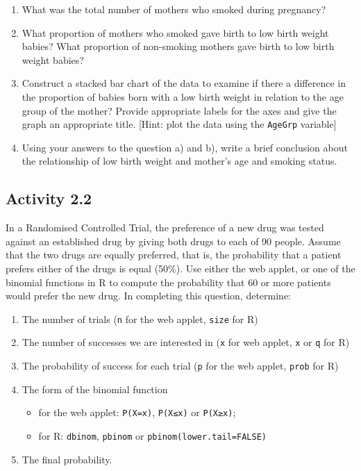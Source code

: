 \documentclass[
  a4paper,
]{memoir}
\providecommand{\tightlist}{%
  \setlength{\itemsep}{0pt}\setlength{\parskip}{0pt}}
\begin{document}
\begin{enumerate}
\def\labelenumi{\alph{enumi})}
\tightlist
\item
  What was the total number of mothers who smoked during pregnancy?
\item
  What proportion of mothers who smoked gave birth to low birth weight
  babies? What proportion of non-smoking mothers gave birth to low birth
  weight babies?
\item
  Construct a stacked bar chart of the data to examine if there a
  difference in the proportion of babies born with a low birth weight in
  relation to the age group of the mother? Provide appropriate labels
  for the axes and give the graph an appropriate title. {[}Hint: plot
  the data using the \texttt{AgeGrp} variable{]}
\item
  Using your answers to the question a) and b), write a brief conclusion
  about the relationship of low birth weight and mother's age and
  smoking status.
\end{enumerate}

\subsection*{Activity 2.2}\label{activity-2.2}

In a Randomised Controlled Trial, the preference of a new drug was
tested against an established drug by giving both drugs to each of 90
people. Assume that the two drugs are equally preferred, that is, the
probability that a patient prefers either of the drugs is equal (50\%).
Use either the web applet, or one of the binomial functions in R to
compute the probability that 60 or more patients would prefer the new
drug. In completing this question, determine:

\begin{enumerate}
\def\labelenumi{\alph{enumi})}
\tightlist
\item
  The number of trials (\texttt{n} for the web applet, \texttt{size} for
  R)
\item
  The number of successes we are interested in (\texttt{x} for web
  applet, \texttt{x} or \texttt{q} for R)
\item
  The probability of success for each trial (\texttt{p} for the web
  applet, \texttt{prob} for R)
\item
  The form of the binomial function

  \begin{itemize}
  \tightlist
  \item
    for the web applet: \texttt{P(X=x)}, \texttt{P(X≤x)} or
    \texttt{P(X≥x)};
  \item
    for R: \texttt{dbinom}, \texttt{pbinom} or
    \texttt{pbinom(lower.tail=FALSE)}
  \end{itemize}
\item
  The final probability.
\end{enumerate}
\end{document}

